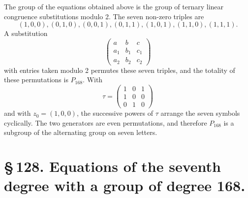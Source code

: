 \documentclass[11pt]{article}
\begin{document}
The group of the equations obtained above is the group of ternary linear congruence substitutions modulo 2. The seven non-zero triples are
\begin{equation}
(1,0,0),(0,1,0),(0,0,1),(0,1,1),(1,0,1),(1,1,0),(1,1,1).
\tag{1}
\end{equation}
A substitution
\begin{equation}
\begin{pmatrix}
a&b&c\\ a_1&b_1&c_1\\ a_2&b_2&c_2
\end{pmatrix}
\tag{2}
\end{equation}
with entries taken modulo 2 permutes these seven triples, and the totality of these permutations is \(P_{168}\). With
\begin{equation}
\tau=\begin{pmatrix}1&0&1\\1&0&0\\0&1&0\end{pmatrix}
\tag{3}
\end{equation}
and with \(z_0=(1,0,0)\), the successive powers of \(\tau\) arrange the seven symbols cyclically. The two generators are even permutations, and therefore \(P_{168}\) is a subgroup of the alternating group on seven letters.

\section*{\S\,128. Equations of the seventh degree with a group of degree 168.}
\end{document}
